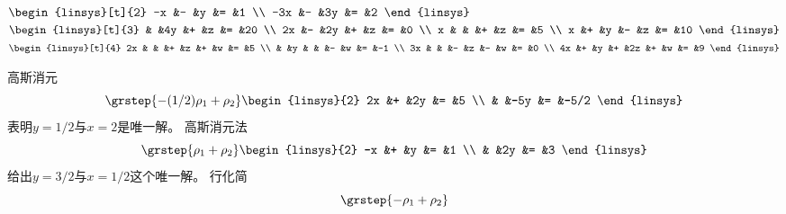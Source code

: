 \begin{exercises}
\begin{exparts*}
             \) 
      \partsitem  \(
               \begin{linsys}[t]{2}
                  -x  &-  &y   &=  &1  \\
                 -3x  &-  &3y  &=  &2  
               \end{linsys}
             \) 
      \partsitem  \(
               \begin{linsys}[t]{3}
                      &   &4y  &+  &z  &=  &20 \\
                  2x  &-  &2y  &+  &z  &=  &0  \\
                   x  &   &    &+  &z  &=  &5  \\
                   x  &+  &y   &-  &z  &=  &10 
                \end{linsys}
             \)
      \partsitem \( \begin{linsys}[t]{4}
                 2x  &   &   &+  &z  &+  &w  &=  &5  \\
                     &   &y  &   &   &-  &w  &=  &-1 \\
                 3x  &   &   &-  &z  &-  &w  &=  &0  \\
                 4x  &+  &y  &+  &2z &+  &w  &=  &9  
               \end{linsys}
            \)
    \end{exparts*}
    \begin{answer} 
      \begin{exparts}
       \partsitem 高斯消元
        \begin{equation*}
          \grstep{-(1/2)\rho_1+\rho_2}
          \begin{linsys}{2}
             2x  &+  &2y  &=  &5  \\
                 &   &-5y &=  &-5/2  
          \end{linsys}
        \end{equation*}
        表明\( y=1/2 \)与\( x=2 \)是唯一解。
      \partsitem 高斯消元法
        \begin{equation*}
          \grstep{\rho_1+\rho_2}
          \begin{linsys}{2}
             -x  &+  &y   &=  &1  \\
                 &   &2y  &=  &3  
           \end{linsys}
        \end{equation*}
        给出\( y=3/2 \)与\( x=1/2 \)这个唯一解。
      \partsitem 行化简
        \begin{equation*}
            \grstep{-\rho_1+\rho_2}

\end{equation*}
\end{exparts}
\end{answer}
\end{exercises}
